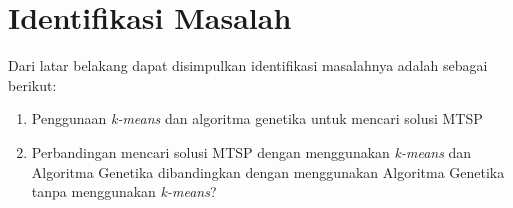\section{Identifikasi Masalah}

Dari latar belakang dapat disimpulkan identifikasi masalahnya adalah sebagai berikut:
\begin{enumerate}
	\item Penggunaan \textit{k-means} dan algoritma genetika untuk mencari solusi MTSP
	\item Perbandingan mencari solusi MTSP dengan menggunakan \textit{k-means} dan Algoritma Genetika dibandingkan dengan menggunakan Algoritma Genetika tanpa menggunakan \textit{k-means}?
\end{enumerate}